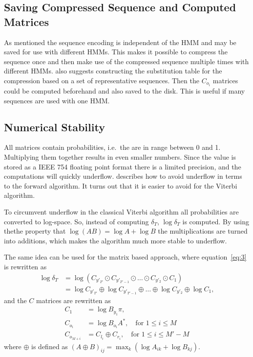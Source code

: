 \subsection{Saving Compressed Sequence and Computed Matrices}
\label{sec:saving-compr-sequ}

As mentioned the sequence encoding is independent of the HMM and may be saved
for use with different HMMs. This makes it possible to compress the sequence
once and then make use of the compressed sequence multiple times with different
HMMs. \citet{lifshits2009speeding} also suggests constructing the substitution
table for the compression based on a set of representative sequences. Then the
$C_{o_i}$ matrices could be computed beforehand and also saved to the
disk. This is useful if many sequences are used with one HMM.\

\subsection{Numerical Stability}

All matrices contain probabilities, i.e.\ the are in range between 0 and
1. Multiplying them together results in even smaller numbers. Since the value
is stored as a IEEE 754 floating point format there is a limited precision,
and the computations will quickly underflow. \citet{sand2013ziphmmlib}
describes how to avoid underflow in terms to the forward algorithm. It turns
out that it is easier to avoid for the Viterbi algorithm.

To circumvent underflow in the classical Viterbi algorithm all probabilities
are converted to log-space. So, instead of computing $\delta_T$,
$\log \delta_T$ is computed. By using thethe property that
$\log(AB) = \log A + \log B$ the multiplications are turned into additions,
which makes the algorithm much more stable to underflow.

The same idea can be used for the matrix based approach, where
equation~\eqref{eq:3} is rewritten as
\begin{align*}
  \log \delta_T &= \log \left(C_{y'_{T'}} \odot C_{y'_{T'-1}} \odot \dots \odot
                  C_{y'_2} \odot C_1 \right) \\
                &= \log C_{y'_{T'}} \oplus \log C_{y'_{T'-1}} \oplus \dots \oplus
                  \log C_{y'_2} \oplus \log C_1,
\end{align*}
and the $C$ matrices are rewritten as
\begin{align*}
  C_1 &= \log B_{y_1} \pi, \\
  C_{o_i} &= \log B_{o_i} A^*, \quad \text{for }1 \le i \le M\\
  C_{o_{M + i}} &= C_{l_i} \oplus C_{r_i} , \quad \text{for }1 \le i \le M' - M
\end{align*}
where $\oplus$ is defined as
${ \left( A \oplus B \right)}_{ij} = \max_k \left( \log A_{ik} + \log B_{kj}
\right)$.


